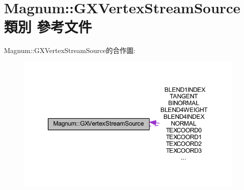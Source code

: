 \hypertarget{class_magnum_1_1_g_x_vertex_stream_source}{}\section{Magnum\+:\+:G\+X\+Vertex\+Stream\+Source 類別 參考文件}
\label{class_magnum_1_1_g_x_vertex_stream_source}


Magnum\+:\+:G\+X\+Vertex\+Stream\+Source的合作圖\+:\nopagebreak
\begin{figure}[H]
\begin{center}
\leavevmode
\includegraphics[width=338pt]{class_magnum_1_1_g_x_vertex_stream_source__coll__graph}
\end{center}
\end{figure}
